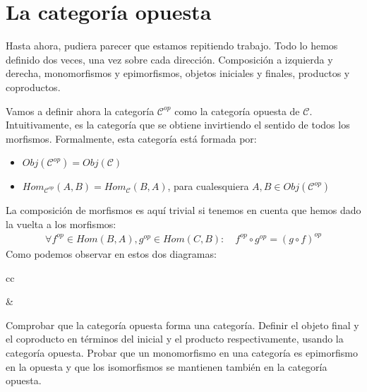 \documentclass[a4paper, 11pt]{amsart}
\newcommand{\C}{\mathcal{C} }
\theoremstyle{definition}
\theoremstyle{remark}
\numberwithin{equation}{section}
\begin{document}
\newpage
\section {La categoría opuesta}
  Hasta ahora, pudiera parecer que estamos repitiendo trabajo. Todo lo hemos definido dos veces,
  una vez sobre cada dirección. Composición a izquierda y derecha, monomorfismos y epimorfismos,
  objetos iniciales y finales, productos y coproductos. 
  
  Vamos a definir ahora la categoría $\C^{op}$ como la categoría opuesta de $\C$. Intuitivamente,
  es la categoría que se obtiene invirtiendo el sentido de todos los morfismos. Formalmente,
  esta categoría está formada por:
  \begin{itemize}
   \item $Obj(\C^{op}) = Obj(\C)$
   \item $Hom_{\C^{op}}(A,B) = Hom_{\C}(B,A)$, para cualesquiera $A,B \in Obj(\C^{op})$
  \end{itemize}
  La composición de morfismos es aquí trivial si tenemos en cuenta que hemos dado la vuelta
  a los morfismos:
  \begin{gather*}
   \forall f^{op} \in Hom(B,A), g^{op} \in Hom(C,B):\quad f^{op} \circ g^{op} = (g \circ f)^{op}
  \end{gather*}
  Como podemos observar en estos dos diagramas:
  \begin{center}
  \begin{tabular}{cc}
      &
  \end{tabular}
  \end{center}

  \exca Comprobar que la categoría opuesta forma una categoría.
  \exca Definir el objeto final y el coproducto en términos del inicial y el producto 
  respectivamente, usando la categoría opuesta.
  \exca Probar que un monomorfismo en una categoría es epimorfismo en la opuesta
  y que los isomorfismos se mantienen también en la categoría opuesta.
  
\newpage
\end{document}
